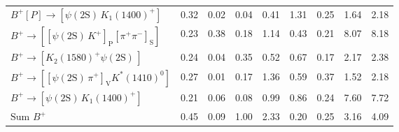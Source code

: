 \begin{tabular}{l  c  c  c  c  c  c  c  | c }
$B^{+}\left[P\right]\rightarrow \left[\psi(\text{2S})\,K_{1}(1400)^{+}\right]$ & 0.32 & 0.02 & 0.04 & 0.41 & 1.31 & 0.25 & 1.64 & 2.18 \\ 
$B^{+}\rightarrow \left[\left[\psi(\text{2S})\,K^{+}\right]_{\text{P}}\left[\pi^{+}\pi^{-}\right]_{\text{S}}\right]$ & 0.23 & 0.38 & 0.18 & 1.14 & 0.43 & 0.21 & 8.07 & 8.18 \\ 
$B^{+}\rightarrow \left[K_{2}(1580)^{+}\psi(\text{2S})\,\right]$ & 0.24 & 0.04 & 0.35 & 0.52 & 0.67 & 0.17 & 2.17 & 2.38 \\ 
$B^{+}\rightarrow \left[\left[\psi(\text{2S})\,\pi^{+}\right]_{\text{V}}K^{*}(1410)^{0}\right]$ & 0.27 & 0.01 & 0.17 & 1.36 & 0.59 & 0.37 & 1.52 & 2.18 \\ 
$B^{+}\rightarrow \left[\psi(\text{2S})\,K_{1}(1400)^{+}\right]$ & 0.21 & 0.06 & 0.08 & 0.99 & 0.86 & 0.24 & 7.60 & 7.72 \\ 
$\text{Sum } B^{+}$ & 0.45 & 0.09 & 1.00 & 2.33 & 0.20 & 0.25 & 3.16 & 4.09 \\ 
\hline
\hline
\end{tabular}
